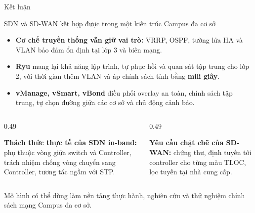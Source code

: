 \documentclass[aspectratio=169, 10pt, xcolor={table}]{beamer}
\begin{document}
\begin{frame}{Kết luận}
    \vspace{0.1cm}
    \begin{card}{SDN và SD-WAN kết hợp được trong một kiến trúc Campus đa cơ sở}
        \footnotesize
        \begin{itemize}\setlength{\itemsep}{3pt}
            \item \textbf{Cơ chế truyền thống vẫn giữ vai trò:} VRRP, OSPF, tường lửa HA và VLAN bảo đảm ổn định tại lớp 3 và biên mạng.
            \item \textbf{Ryu} mang lại khả năng lập trình, tự phục hồi và quan sát tập trung cho lớp 2, với thời gian thêm VLAN và áp chính sách tính bằng \textbf{mili giây}.
            \item \textbf{vManage, vSmart, vBond} điều phối overlay an toàn, chính sách tập trung, tự chọn đường giữa các cơ sở và chủ động cảnh báo.
        \end{itemize}
    \end{card}
    \begin{columns}[T]
        \begin{column}{0.49\textwidth}
            \begin{softcard}[accentSoft]\scriptsize
                \textbf{\color{accent}Thách thức thực tế của SDN in-band:} phụ thuộc vòng giữa switch và Controller, trách nhiệm chống vòng chuyển sang Controller, tương tác ngầm với STP.
            \end{softcard}
        \end{column}
        \begin{column}{0.49\textwidth}
            \begin{softcard}\scriptsize
                \textbf{\color{brand}Yêu cầu chặt chẽ của SD-WAN:} chứng thư, định tuyến tới controller cho từng màu TLOC, lọc tuyến tại nhà cung cấp.
            \end{softcard}
        \end{column}
    \end{columns}
    \vspace{0.05cm}
    {\centering\footnotesize\color{inkSoft}Mô hình có thể dùng làm nền tảng thực hành, nghiên cứu và thử nghiệm chính sách mạng Campus đa cơ sở.\par}
\end{frame}
\end{document}
